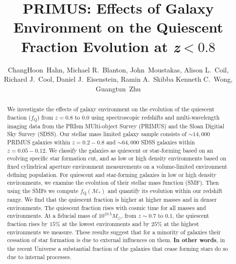 \documentclass{emulateapj}
\begin{document}
\title{PRIMUS: Effects of Galaxy Environment on the Quiescent Fraction Evolution at \lowercase{\textit{z}}$<0.8$}
\author{
ChangHoon~Hahn, 
Michael R.~Blanton, 
John~Moustakas,
Alison L.~Coil, 
Richard J.~Cool, 
Daniel J.~Eisenstein,
Ramin A.~Skibba
Kenneth C.~Wong, 
Guangtun~Zhu
}
\begin{abstract}
We investigate the effects of galaxy environment on the evolution of
the quiescent fraction ($f_{\mathrm{Q}}$) from $z =0.8 $ to $ 0.0$ using
spectroscopic redshifts and multi-wavelength imaging data from the
PRIsm MUlti-object Survey (PRIMUS) and the Sloan Digitial Sky Survey
(SDSS). Our stellar mass limited galaxy sample consists of $\sim
14,000$ PRIMUS galaxies within $z = 0.2-0.8$ and $\sim 64,000$ SDSS
galaxies within $z = 0.05-0.12$. We classify the galaxies as quiescent
or star-forming based on an evolving specific star formation cut, and
as low or high density environments based on fixed cylindrical
aperture environment measurements on a volume-limited environment
defining population. For quiescent and
star-forming galaxies in low or high density environments, we examine
the evolution of their stellar mass function (SMF). Then using the
SMFs we compute $f_{\mathrm{Q}}(\mathcal{M}_{*})$ and quantify its
evolution within our redshift range. We find that the quiescent
fraction is higher at higher masses and in denser environments. The
quiescent fraction rises with cosmic time for all masses and
environments. At a fiducial mass of $10^{10.5}M_\odot$, from $z\sim
0.7$ to $0.1$, the quiescent fraction rises by $15\%$ at the
lowest environments and by $25\%$ at the highest environments we measure.
These results suggest that for a minority of galaxies their cessation
of star formation is due to external influences on
them. {\bf In other words}, in the recent Universe a substantial fraction of the
galaxies that cease forming stars do so due to internal processes.
\end{abstract}
\end{document}
